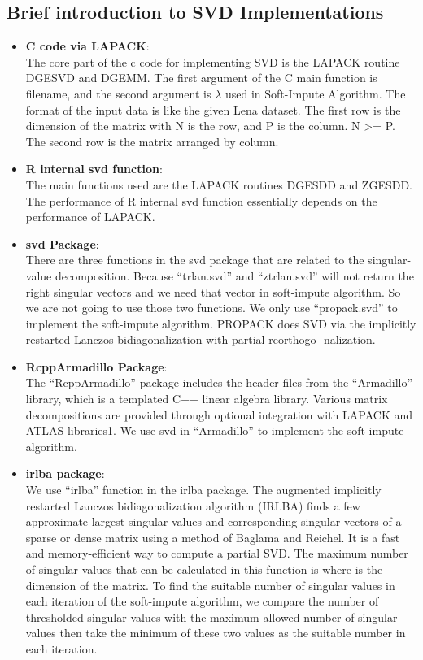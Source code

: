 \documentclass[12pt]{article}
\begin{document}
\subsection{Brief introduction to SVD Implementations}
\begin{itemize}
	\item \textbf{C code via LAPACK}:\\
	The core part of the c code for implementing SVD is the LAPACK routine DGESVD and DGEMM. The first argument of the C main function is filename, and the second argument is $\lambda$ used in Soft-Impute Algorithm. The format of the input data is like the given Lena dataset. The first row is the dimension of the matrix with N is the row, and P is the column. N >= P.  The second row is the matrix arranged by column.
		\item \textbf{R internal svd function}: \\
	The main functions used are the LAPACK routines DGESDD and ZGESDD. The performance of R internal svd function essentially depends on the performance of LAPACK.
	\item \textbf{svd Package}: \\
	There are three functions in the svd package that are related to the singular-value decomposition. Because “trlan.svd” and “ztrlan.svd” will not return the right singular vectors and we need that vector in soft-impute algorithm. So we are not going to use those two functions. We only use “propack.svd” to implement the soft-impute algorithm. 
	PROPACK does SVD via the implicitly restarted Lanczos bidiagonalization with partial reorthogo- nalization.
	\item \textbf{RcppArmadillo Package}: \\	
	The “RcppArmadillo” package includes the header files from the “Armadillo” library, which is a templated C++ linear algebra library. Various matrix decompositions are provided through optional integration with LAPACK and ATLAS libraries1.  We use svd in “Armadillo” to implement the soft-impute algorithm.
	\item \textbf{irlba package}: \\
	We use “irlba” function in the irlba package. The augmented implicitly restarted Lanczos bidiagonalization algorithm (IRLBA) finds a few approximate largest singular values and corresponding singular vectors of a sparse or dense matrix using a method of Baglama and Reichel. It is a fast and memory-efficient way to compute a partial SVD.
	The maximum number of singular values that can be calculated in this function is 
	where  is the dimension of the matrix.
	To find the suitable number of singular values in each iteration of the soft-impute algorithm, we compare the number of thresholded singular values with the maximum allowed number of singular values then take the minimum of these two values as the suitable number in each iteration.
\end{itemize}
\end{document}
